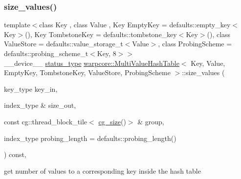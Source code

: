 \subsubsection{\texorpdfstring{size\+\_\+values()}{size\_values()}\hspace{0.1cm}{\footnotesize\ttfamily [1/3]}}
{\footnotesize\ttfamily template$<$class Key , class Value , Key Empty\+Key = defaults\+::empty\+\_\+key$<$\+Key$>$(), Key Tombstone\+Key = defaults\+::tombstone\+\_\+key$<$\+Key$>$(), class Value\+Store  = defaults\+::value\+\_\+storage\+\_\+t$<$\+Value$>$, class Probing\+Scheme  = defaults\+::probing\+\_\+scheme\+\_\+t$<$\+Key, 8$>$$>$ \\
\+\_\+\+\_\+device\+\_\+\+\_\+ \hyperlink{classwarpcore_1_1Status}{status\+\_\+type} \hyperlink{classwarpcore_1_1MultiValueHashTable}{warpcore\+::\+Multi\+Value\+Hash\+Table}$<$ Key, Value, Empty\+Key, Tombstone\+Key, Value\+Store, Probing\+Scheme $>$\+::size\+\_\+values (\begin{DoxyParamCaption}\item[{key\+\_\+type}]{key\+\_\+in,  }\item[{index\+\_\+type \&}]{size\+\_\+out,  }\item[{const cg\+::thread\+\_\+block\+\_\+tile$<$ \hyperlink{classwarpcore_1_1MultiValueHashTable_a2191f42810234e459bc4ef6e491ec929}{cg\+\_\+size}()$>$ \&}]{group,  }\item[{index\+\_\+type}]{probing\+\_\+length = {\ttfamily defaults\+:\+:probing\+\_\+length()} }\end{DoxyParamCaption}) const\hspace{0.3cm}{\ttfamily [inline]}, {\ttfamily [noexcept]}}



get number of values to a corresponding key inside the hash table 


